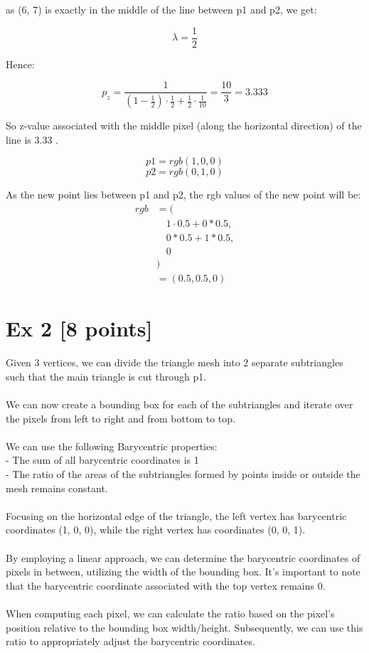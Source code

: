\documentclass{article}
\begin{document}
as (6, 7) is exactly in the middle of the line between p1 and p2, we get:

\[
    \lambda = \frac{1}{2}
\]

Hence:

\[
    p_z = \frac{1}{(1 - \frac{1}{2}) \cdot \frac{1}{2} + \frac{1}{2} \cdot \frac{1}{10}} = \frac{10}{3} = 3.333
\]

So z-value associated with the middle pixel (along the horizontal direction) of the line is 3.33 .

\[
    p1 = rgb(1, 0, 0)
\]
\[
    p2 = rgb(0, 1, 0)
\]

As the new point lies between p1 and p2, the rgb values of the new point will be:
\begin{align*}
    rgb & = (                          \\
        & \quad 1 \cdot 0.5 + 0 * 0.5, \\
        & \quad 0 * 0.5 + 1 * 0.5,     \\
        & \quad 0                      \\
        & )                            \\
        & = (0.5, 0.5, 0)
\end{align*}

\section*{Ex 2 [8 points]}


Given 3 vertices, we can divide the triangle mesh into 2 separate subtriangles such that the main triangle is cut through p1.\\\\
We can now create a bounding box for each of the subtriangles and iterate over the pixels from left to right and from bottom to top.\\\\
We can use the following Barycentric properties: \\
- The sum of all barycentric coordinates is 1\\
- The ratio of the areas of the subtriangles formed by points inside or outside the mesh remains constant.
\\\\
Focusing on the horizontal edge of the triangle, the left vertex has barycentric coordinates (1, 0, 0), while the right vertex has coordinates (0, 0, 1). \\\\
By employing a linear approach, we can determine the barycentric coordinates of pixels in between, utilizing the width of the bounding box.
It's important to note that the barycentric coordinate associated with the top vertex remains 0. \\\\
When computing each pixel, we can calculate the ratio based on the pixel's position relative to the bounding box width/height. Subsequently, we can use this ratio to appropriately adjust the barycentric coordinates. \\
\end{document}
